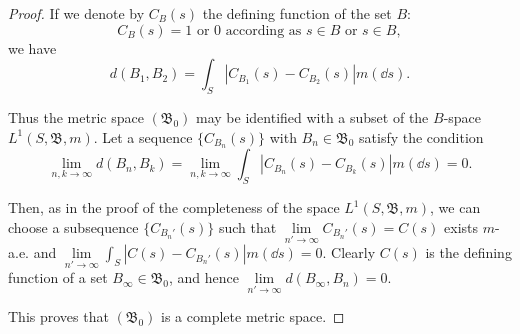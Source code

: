 \begin{proof}
 If we denote by $C_B(s)$ the defining function of the set $B$: 
\[
C _{B} (s) = 1 \text{ or } 0 \text{ according as } s \in B \text{ or } s \in B,
\]
we have 
\begin{equation}\label{eq:II.2.2}
d \left(B _{1}, B _{2}\right) = \int_{S} \left| C _ {B _{1}} (s) - C _ {B _{2}} (s) \right| m (\dd s). \end{equation}

Thus the metric space $(\mathfrak{B}_0)$ may be identified with a subset of the $B$-space $L^1(S, \mathfrak{B}, m)$. Let a sequence $\{C_{B_{n}}(s)\}$ with $B_n \in \mathfrak{B}_0$ satisfy the condition 
\[
\lim\limits _{n, k \rightarrow \infty} d (B _{n}, B _{k}) = \lim\limits _{n, k \rightarrow \infty} \int_{S} | C _ {B _{n}} (s) - C _ {B _{k}} (s) | m (\dd s) = 0.
\]

Then, as in the proof of the completeness of the space $L^1(S, \mathfrak{B}, m)$, we can choose a subsequence $\{C_{B_n'}(s)\}$ such that $\lim\limits_{n' \to \infty} C_{B_n'}(s) = C(s)$ exists $m$-a.e. and $\lim\limits_{n' \to \infty} \int_S |C(s) - C_{B_n'}(s)| m(\dd s) = 0$. Clearly $C(s)$ is the defining function of a set $B_\infty \in \mathfrak{B}_0$, and hence $\lim\limits_{n' \to \infty} d(B_\infty, B_n) = 0$. 

This proves that $(\mathfrak{B}_{0})$ is a complete metric space. 
\end{proof}

